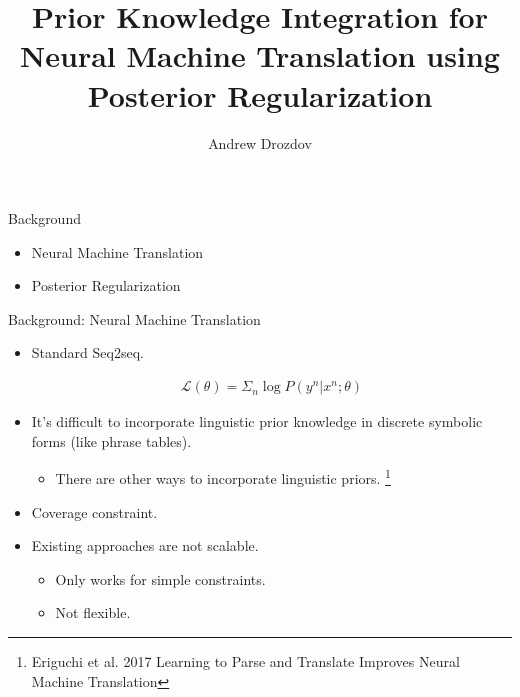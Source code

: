 \documentclass{beamer}
\title[Posterior Regularization]{Prior Knowledge Integration for Neural Machine Translation using Posterior Regularization}
\author{Andrew Drozdov}
\begin{document}
\begin{frame}
  \titlepage
\end{frame}
%

\begin{frame}{Background}{}
\begin{itemize}
\item Neural Machine Translation
\item Posterior Regularization
\end{itemize}
\end{frame}

\begin{frame}{Background: Neural Machine Translation}{}
\begin{itemize}
\item Standard Seq2seq.

\begin{align*}
\mathcal{L}(\theta) = \Sigma_n \log P(y^n|x^n;\theta)
\end{align*}

\item It's difficult to incorporate linguistic prior knowledge in discrete symbolic forms (like phrase tables).
\begin{itemize}
\item There are other ways to incorporate linguistic priors. \footnote[frame]{Eriguchi et al. 2017 Learning to Parse and Translate Improves Neural Machine Translation}
\end{itemize}

\item Coverage constraint.

\item Existing approaches are not scalable.
\begin{itemize}
\item Only works for simple constraints.
\item Not flexible.
\end{itemize}
\end{itemize}

\end{frame}
\end{document}
